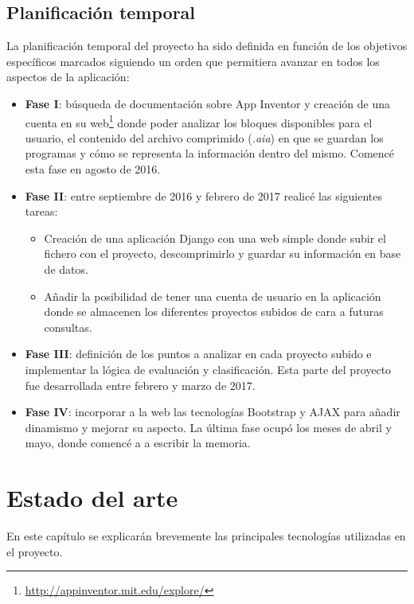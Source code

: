 \documentclass[a4paper, 12pt]{book}
\begin{document}
\section{Planificación temporal}
\label{sec:planificacion-temporal}
La planificación temporal del proyecto ha sido definida en función de los objetivos específicos marcados siguiendo un orden que permitiera avanzar en todos los aspectos de la aplicación:
\begin{itemize}
  \item \textbf{Fase I}: búsqueda de documentación sobre App Inventor y creación de una cuenta en su web\footnote{\url{http://appinventor.mit.edu/explore/}} donde poder analizar los bloques disponibles para el usuario, el contenido del archivo comprimido (\textit{.aia}) en que se guardan los programas y cómo se representa la información dentro del mismo. Comencé esta fase en agosto de 2016.

  \item \textbf{Fase II}: entre septiembre de 2016 y febrero de 2017 realicé las siguientes tareas:
	\begin{itemize}
		\item Creación de una aplicación Django con una web simple donde subir el fichero con el proyecto, descomprimirlo y guardar su información en base de datos.
		\item Añadir la posibilidad de tener una cuenta de usuario en la aplicación donde se almacenen los diferentes proyectos subidos de cara a futuras consultas. 
	\end{itemize}
  \item \textbf{Fase III}: definición de los puntos a analizar en cada proyecto subido e implementar la lógica de evaluación y clasificación. Esta parte del proyecto fue desarrollada entre febrero y marzo de 2017.
  
  
  \item \textbf{Fase IV}: incorporar a la web las tecnologías Bootstrap y AJAX para añadir dinamismo y mejorar su aspecto.  La última fase ocupó los meses de abril y mayo, donde comencé a a escribir la memoria. 
\end{itemize}



\cleardoublepage
\chapter{Estado del arte}
En este capítulo se explicarán brevemente las principales tecnologías utilizadas en el proyecto.
\end{document}
